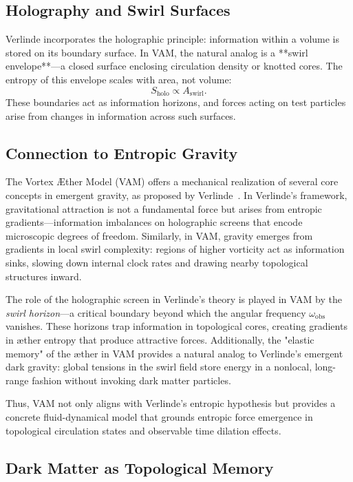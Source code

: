 \subsection*{Holography and Swirl Surfaces}

Verlinde incorporates the holographic principle: information within a volume is stored on its boundary surface. In VAM, the natural analog is a **swirl envelope**—a closed surface enclosing circulation density or knotted cores. The entropy of this envelope scales with area, not volume:
\begin{equation}
S_{\text{holo}} \propto A_{\text{swirl}}.
\end{equation}
These boundaries act as information horizons, and forces acting on test particles arise from changes in information across such surfaces.

\subsection*{Connection to Entropic Gravity}

The Vortex Æther Model (VAM) offers a mechanical realization of several core concepts in emergent gravity, as proposed by Verlinde~\cite{verlinde2017emergent}. In Verlinde's framework, gravitational attraction is not a fundamental force but arises from entropic gradients—information imbalances on holographic screens that encode microscopic degrees of freedom. Similarly, in VAM, gravity emerges from gradients in local swirl complexity: regions of higher vorticity act as information sinks, slowing down internal clock rates and drawing nearby topological structures inward.

The role of the holographic screen in Verlinde's theory is played in VAM by the \emph{swirl horizon}—a critical boundary beyond which the angular frequency $\omega_\text{obs}$ vanishes. These horizons trap information in topological cores, creating gradients in æther entropy that produce attractive forces. Additionally, the "elastic memory" of the æther in VAM provides a natural analog to Verlinde's emergent dark gravity: global tensions in the swirl field store energy in a nonlocal, long-range fashion without invoking dark matter particles.

Thus, VAM not only aligns with Verlinde's entropic hypothesis but provides a concrete fluid-dynamical model that grounds entropic force emergence in topological circulation states and observable time dilation effects.


\subsection*{Dark Matter as Topological Memory}

